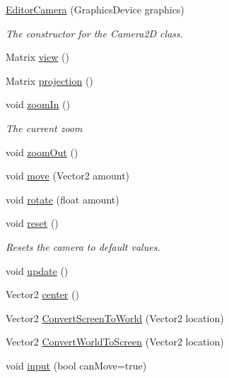 \begin{DoxyCompactItemize}
\item 
\hyperlink{classgearit_1_1src_1_1editor_1_1_editor_camera_afcc9ca983a1414e3b01e99e1bfc10cc2}{Editor\+Camera} (Graphics\+Device graphics)
\begin{DoxyCompactList}\small\item\em The constructor for the Camera2\+D class. \end{DoxyCompactList}\item 
Matrix \hyperlink{classgearit_1_1src_1_1editor_1_1_editor_camera_a9cb0705a909e33866641570d3e253fc2}{view} ()
\item 
Matrix \hyperlink{classgearit_1_1src_1_1editor_1_1_editor_camera_ae70a760b033216c996d0c96f66e8f6c1}{projection} ()
\item 
void \hyperlink{classgearit_1_1src_1_1editor_1_1_editor_camera_afd95edbd7c7b77fdbf5b04c1c9cddfb8}{zoom\+In} ()
\begin{DoxyCompactList}\small\item\em The current zoom \end{DoxyCompactList}\item 
void \hyperlink{classgearit_1_1src_1_1editor_1_1_editor_camera_aae75fd1e6510a740596d069cceb20cff}{zoom\+Out} ()
\item 
void \hyperlink{classgearit_1_1src_1_1editor_1_1_editor_camera_a79dadedfe10340c5d9d6d44d40450d91}{move} (Vector2 amount)
\item 
void \hyperlink{classgearit_1_1src_1_1editor_1_1_editor_camera_a279e6bbfe86cba526880364104d69a3f}{rotate} (float amount)
\item 
void \hyperlink{classgearit_1_1src_1_1editor_1_1_editor_camera_a044cfdf432b0f11c51bfbed9a32b3cd2}{reset} ()
\begin{DoxyCompactList}\small\item\em Resets the camera to default values. \end{DoxyCompactList}\item 
void \hyperlink{classgearit_1_1src_1_1editor_1_1_editor_camera_a46b7a87110c20b40c68b0b468d666dac}{update} ()
\item 
Vector2 \hyperlink{classgearit_1_1src_1_1editor_1_1_editor_camera_a4946a20fe1fe894e4b0f9bf200b7faf1}{center} ()
\item 
Vector2 \hyperlink{classgearit_1_1src_1_1editor_1_1_editor_camera_a4451d09612304490115d8ac50ec8ac79}{Convert\+Screen\+To\+World} (Vector2 location)
\item 
Vector2 \hyperlink{classgearit_1_1src_1_1editor_1_1_editor_camera_a84ffacf12cf90fd76f883aa843feeeff}{Convert\+World\+To\+Screen} (Vector2 location)
\item 
void \hyperlink{classgearit_1_1src_1_1editor_1_1_editor_camera_a57a152a668bd8c2b40f4cae448265b52}{input} (bool can\+Move=true)
\end{DoxyCompactItemize}

